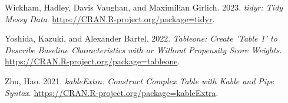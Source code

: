 \documentclass[
  letterpaper,
]{latex/krantz}
\newlength{\cslhangindent}
\newenvironment{CSLReferences}[2] %
 {\begin{list}{}{%
  \setlength{\itemindent}{0pt}
  \setlength{\leftmargin}{0pt}
  \setlength{\parsep}{0pt}
  \ifodd #1
   \setlength{\leftmargin}{\cslhangindent}
   \setlength{\itemindent}{-1\cslhangindent}
  \fi
  \setlength{\itemsep}{#2\baselineskip}}}
 {\end{list}}
\begin{document}
\begin{CSLReferences}{1}{0}
Wickham, Hadley, Davis Vaughan, and Maximilian Girlich. 2023.
\emph{{tidyr: Tidy Messy Data}}.
\url{https://CRAN.R-project.org/package=tidyr}.

Yoshida, Kazuki, and Alexander Bartel. 2022. \emph{Tableone: Create
'Table 1' to Describe Baseline Characteristics with or Without
Propensity Score Weights}.
\url{https://CRAN.R-project.org/package=tableone}.

Zhu, Hao. 2021. \emph{kableExtra: Construct Complex Table with Kable and
Pipe Syntax}. \url{https://CRAN.R-project.org/package=kableExtra}.

\end{CSLReferences}



\backmatter
\printindex
\end{document}
